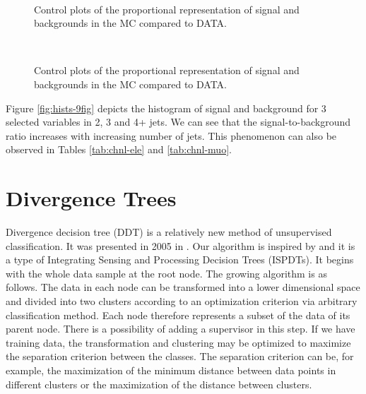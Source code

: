 \begin{figure}[thb]
  \centering
  \\
  \caption{Control plots of the proportional representation of signal and backgrounds in the MC compared to DATA.}
  \label{fig:contrPlots1}
\end{figure} 

\begin{figure}[thb]
  \centering
  \\
  \caption{Control plots of the proportional representation of signal and backgrounds in the MC compared to DATA.}
  \label{fig:contrPlots2}
\end{figure} 

Figure \ref{fig:hists-9fig} depicts the histogram of signal and background for 3 selected variables in 2, 3 and 4+ jets. We can see that the signal-to-background ratio increases with increasing number of jets. This phenomenon can also be observed in Tables \ref{tab:chnl-ele} and \ref{tab:chnl-muo}. 

\clearpage

\section{Divergence Trees}\label{s:DDT}

Divergence decision tree (DDT)  is a relatively new method of unsupervised classification. It was presented in 2005 in \cite{Karakos2005}. Our algorithm is inspired by \cite{Karakos2008} and it is a type of Integrating Sensing and Processing Decision Trees (ISPDTs). It  begins with the whole data sample at the root node. The growing algorithm is as follows. The data in each node can be transformed into a lower dimensional space and divided into two clusters according to an optimization criterion via arbitrary classification method. Each node therefore represents a subset of the data of its parent node.  There is a possibility of adding a supervisor in this step. If we have training data, the transformation and clustering may be optimized to maximize the separation criterion between the classes. The separation criterion can be, for example, the maximization of the minimum distance between data points in different clusters or the maximization of the distance between clusters. 


